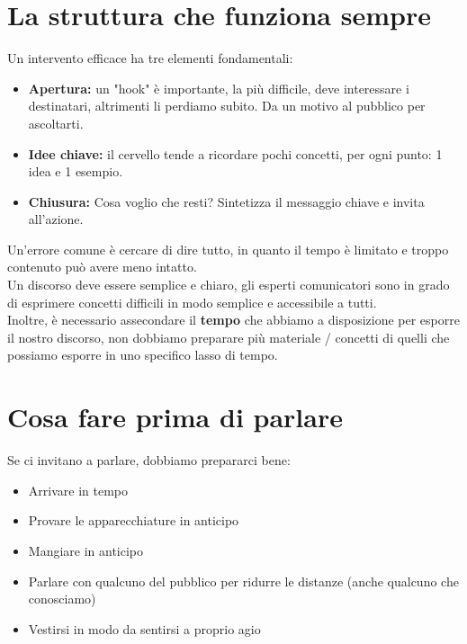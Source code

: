 \documentclass[12pt,a4paper]{article}
\let\oldsection\section
\renewcommand{\section}{\clearpage\oldsection}
\begin{document}
\section{La struttura che funziona sempre}
Un intervento efficace ha tre elementi fondamentali:
\begin{itemize}
    \item \textbf{Apertura:} un "hook" è importante, la più difficile, deve interessare i destinatari, altrimenti li perdiamo subito. Da un motivo al pubblico per ascoltarti.
    \item \textbf{Idee chiave:} il cervello tende a ricordare pochi concetti, per ogni punto: 1 idea e 1 esempio.
    \item \textbf{Chiusura:} Cosa voglio che resti? Sintetizza il messaggio chiave e invita all'azione.
\end{itemize}
Un'errore comune è cercare di dire tutto, in quanto il tempo è limitato e troppo contenuto può avere meno intatto.\\
Un discorso deve essere semplice e chiaro, gli esperti comunicatori sono in grado di esprimere concetti difficili in modo semplice e accessibile a tutti.\\
Inoltre, è necessario assecondare il \textbf{tempo} che abbiamo a disposizione per esporre il nostro discorso, non dobbiamo preparare più materiale / concetti di quelli che possiamo esporre in uno specifico lasso di tempo.

\section{Cosa fare prima di parlare}
Se ci invitano a parlare, dobbiamo prepararci bene:
\begin{itemize}
    \item Arrivare in tempo
    \item Provare le apparecchiature in anticipo
    \item Mangiare in anticipo
    \item Parlare con qualcuno del pubblico per ridurre le distanze (anche qualcuno che conosciamo)
    \item Vestirsi in modo da sentirsi a proprio agio
\end{itemize}
\end{document}
